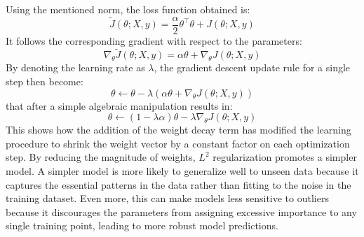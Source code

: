 \documentclass[binding=0.7cm, oneside]{sapthesis}
\begin{document}
Using the mentioned norm, the loss function obtained is:
$$\tilde{J}(\theta; X, y) = \frac{\alpha}{2}\theta^\top\theta + J(\theta; X, y)$$
It follows the corresponding gradient with respect to the parameters:
$$\nabla_\theta\tilde{J}(\theta; X, y) = \alpha\theta + \nabla_\theta J(\theta; X, y)$$
By denoting the learning rate as $\lambda$, the gradient descent update rule for a single step then become:
$$\theta \leftarrow \theta - \lambda(\alpha\theta + \nabla_\theta J(\theta; X, y))$$
that after a simple algebraic manipulation results in:
$$\theta \leftarrow (1 - \lambda\alpha)\theta - \lambda\nabla_\theta J(\theta; X, y)$$
This shows how the addition of the weight decay term has modified the learning procedure to shrink the weight vector by a constant factor on each optimization step.
By reducing the magnitude of weights, $L^2$ regularization promotes a simpler model. A simpler model is more likely to generalize well to unseen data because it captures
the essential patterns in the data rather than fitting to the noise in the training dataset. Even more, this can make models less sensitive to outliers because it discourages
the parameters from assigning excessive importance to any single training point, leading to more robust model predictions.
\end{document}
